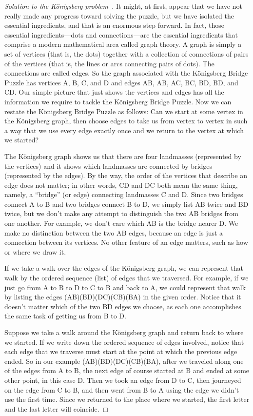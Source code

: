 \begin{proof}[Solution to the K\"onigsberg problem~\cite{Burger2013}]
It might, at first, appear that we have not really made any progress toward solving the puzzle, but we have isolated the essential ingredients, and that is an enormous step forward. In fact, those essential ingredients—dots and connections—are the essential ingredients that comprise a modern mathematical area called graph theory. A graph is simply a set of vertices (that is, the dots) together with a collection of connections of pairs of the vertices (that is, the lines or arcs connecting pairs of dots). The connections are called edges. So the graph associated with the Königsberg Bridge Puzzle has vertices A, B, C, and D and edges AB, AB, AC, BC, BD, BD, and CD. Our simple picture that just shows the vertices and edges has all the information we require to tackle the Königsberg Bridge Puzzle. Now we can restate the Königsberg Bridge Puzzle as follows: Can we start at some vertex in the Königsberg graph, then choose edges to take us from vertex to vertex in such a way that we use every edge exactly once and we return to the vertex at which we started?

The Königsberg graph shows us that there are four landmasses (represented by the vertices) and it shows which landmasses are connected by bridges (represented by the edges). By the way, the order of the vertices that describe an edge does not matter; in other words, CD and DC both mean the same thing, namely, a “bridge” (or edge) connecting landmasses C and D. Since two bridges connect A to B and two bridges connect B to D, we simply list AB twice and BD twice, but we don't make any attempt to distinguish the two AB bridges from one another. For example, we don't care which AB is the bridge nearer D. We make no distinction between the two AB edges, because an edge is just a connection between its vertices. No other feature of an edge matters, such as how or where we draw it.

If we take a walk over the edges of the Königsberg graph, we can represent that walk by the ordered sequence (list) of edges that we traversed. For example, if we just go from A to B to D to C to B and back to A, we could represent that walk by listing the edges (AB)(BD)(DC)(CB)(BA) in the given order. Notice that it doesn't matter which of the two BD edges we choose, as each one accomplishes the same task of getting us from B to D.


Suppose we take a walk around the Königsberg graph and return back to where we started. If we write down the ordered sequence of edges involved, notice that each edge that we traverse must start at the point at which the previous edge ended. So in our example (AB)(BD)(DC)(CB)(BA), after we traveled along one of the edges from A to B, the next edge of course started at B and ended at some other point, in this case D. Then we took an edge from D to C, then journeyed on the edge from C to B, and then went from B to A using the edge we didn't use the first time. Since we returned to the place where we started, the first letter and the last letter will coincide.



\end{proof}
